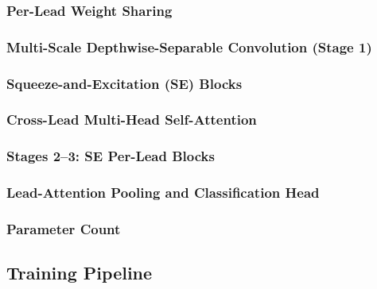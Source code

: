 \documentclass[sigconf,nonacm]{acmart}
\begin{document}
\subsubsection{Per-Lead Weight Sharing}

\subsubsection{Multi-Scale Depthwise-Separable Convolution (Stage 1)}

\subsubsection{Squeeze-and-Excitation (SE) Blocks}

\subsubsection{Cross-Lead Multi-Head Self-Attention}

\subsubsection{Stages 2--3: SE Per-Lead Blocks}

\subsubsection{Lead-Attention Pooling and Classification Head}

\subsubsection{Parameter Count}

\subsection{Training Pipeline}
\end{document}
